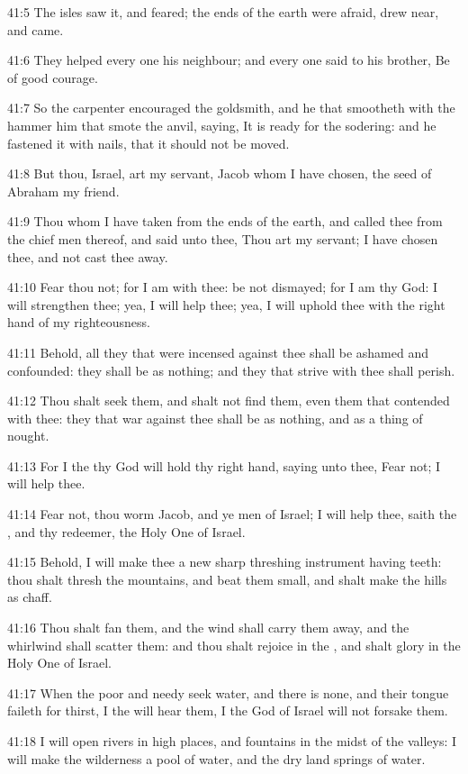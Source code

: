 41:5 The isles saw it, and feared; the ends of the earth were afraid,
drew near, and came.

41:6 They helped every one his neighbour; and every one said to his
brother, Be of good courage.

41:7 So the carpenter encouraged the goldsmith, and he that smootheth
with the hammer him that smote the anvil, saying, It is ready for the
sodering: and he fastened it with nails, that it should not be moved.

41:8 But thou, Israel, art my servant, Jacob whom I have chosen, the
seed of Abraham my friend.

41:9 Thou whom I have taken from the ends of the earth, and called
thee from the chief men thereof, and said unto thee, Thou art my
servant; I have chosen thee, and not cast thee away.

41:10 Fear thou not; for I am with thee: be not dismayed; for I am thy
God: I will strengthen thee; yea, I will help thee; yea, I will uphold
thee with the right hand of my righteousness.

41:11 Behold, all they that were incensed against thee shall be
ashamed and confounded: they shall be as nothing; and they that strive
with thee shall perish.

41:12 Thou shalt seek them, and shalt not find them, even them that
contended with thee: they that war against thee shall be as nothing,
and as a thing of nought.

41:13 For I the \LORD thy God will hold thy right hand, saying unto
thee, Fear not; I will help thee.

41:14 Fear not, thou worm Jacob, and ye men of Israel; I will help
thee, saith the \LORD, and thy redeemer, the Holy One of Israel.

41:15 Behold, I will make thee a new sharp threshing instrument having
teeth: thou shalt thresh the mountains, and beat them small, and shalt
make the hills as chaff.

41:16 Thou shalt fan them, and the wind shall carry them away, and the
whirlwind shall scatter them: and thou shalt rejoice in the \LORD, and
shalt glory in the Holy One of Israel.

41:17 When the poor and needy seek water, and there is none, and their
tongue faileth for thirst, I the \LORD will hear them, I the God of
Israel will not forsake them.

41:18 I will open rivers in high places, and fountains in the midst of
the valleys: I will make the wilderness a pool of water, and the dry
land springs of water.

